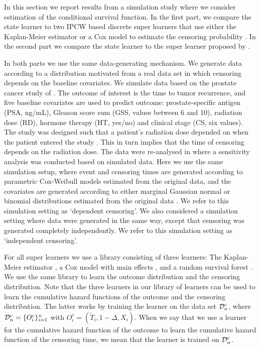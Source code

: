 In this section we report results from a simulation study where we consider
estimation of the conditional survival function. In the first part, we compare
the state learner to two IPCW based discrete super learners that use either the
Kaplan-Meier estimator or a Cox model to estimate the censoring probability
\citep{gonzalez2021stacked}. In the second part we compare the state learner to
the super learner proposed by \cite{westling2021inference}.

In both parts we use the same data-generating mechanism. We generate data
according to a distribution motivated from a real data set in which censoring
depends on the baseline covariates. We simulate data based on the prostate
cancer study of \cite{kattan2000pretreatment}. The outcome of interest is the
time to tumor recurrence, and five baseline covariates are used to predict
outcome: prostate-specific antigen (PSA, ng/mL), Gleason score sum (GSS, values
between 6 and 10), radiation dose (RD), hormone therapy (HT, yes/no) and
clinical stage (CS, six values). The study was designed such that a patient's
radiation dose depended on when the patient entered the study
\citep{gerds2013estimating}. This in turn implies that the time of censoring
depends on the radiation dose. The data were re-analysed in
\citep{gerds2013estimating} where a sensitivity analysis was conducted based on
simulated data. Here we use the same simulation setup, where event and censoring
times are generated according to parametric Cox-Weibull models estimated from
the original data, and the covariates are generated according to either marginal
Gaussian normal or binomial distributions estimated from the original data
\citep[c.f.,][Section~4.6]{gerds2013estimating}. We refer to this simulation
setting as `dependent censoring'. We also considered a simulation setting where
data were generated in the same way, except that censoring was generated
completely independently. We refer to this simulation setting as `independent
censoring'.

For all super learners we use a library consisting of three learners:
The Kaplan-Meier estimator
\citep{kaplan1958nonparametric,Gerds_2019prodlim}, a Cox model with
main effects \citep{cox1972regression, survival-package}, and a random
survival forest \citep{ishwaran2008random,rfsrc-paclage}. We use the
same library to learn the outcome distribution and the censoring
distribution. Note that the three learners in our library of learners
can be used to learn the cumulative hazard functions of the 
outcome and the censoring distribution. The latter works by
training the learner on the data set \( \mathcal{D}_n^c \), where
\( \mathcal{D}_n^c = \{O_i^c\}_{i=1}^n \) with
\( O_i^c = (\tilde{T}_i, 1-\Delta, X_i) \). When we say that we use a
learner for the cumulative hazard function of the outcome to learn the
cumulative hazard function of the censoring time, we mean that the
learner is trained on \( \mathcal{D}_n^c \).

